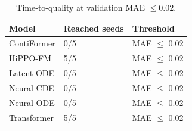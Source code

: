 \begin{table}[t]
\centering
\small
\caption{Time-to-quality at validation MAE $\leq 0.02$.}
\label{tab:rebuttal-ttq}
\begin{tabular}{lll}
\toprule
Model & Reached seeds & Threshold \\
\midrule
ContiFormer & 0/5 & MAE $\leq$ 0.02 \\
HiPPO-FM & 5/5 & MAE $\leq$ 0.02 \\
Latent ODE & 0/5 & MAE $\leq$ 0.02 \\
Neural CDE & 0/5 & MAE $\leq$ 0.02 \\
Neural ODE & 0/5 & MAE $\leq$ 0.02 \\
Transformer & 5/5 & MAE $\leq$ 0.02 \\
\bottomrule
\end{tabular}

\end{table}


